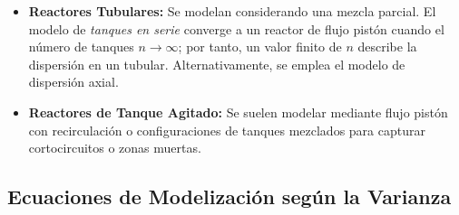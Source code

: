 \begin{itemize}
    \item \textbf{Reactores Tubulares:} Se modelan considerando una mezcla parcial. El modelo de \textit{tanques en serie} converge a un reactor de flujo pistón cuando el número de tanques $n \to \infty$; por tanto, un valor finito de $n$ describe la dispersión en un tubular. Alternativamente, se emplea el modelo de dispersión axial.
    \item \textbf{Reactores de Tanque Agitado:} Se suelen modelar mediante flujo pistón con recirculación o configuraciones de tanques mezclados para capturar cortocircuitos o zonas muertas.
\end{itemize}

\subsection{Ecuaciones de Modelización según la Varianza}

